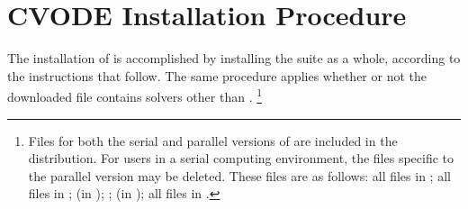 \chapter{CVODE Installation Procedure}\label{s:install}

The installation of {\cvode} is accomplished by installing the
{\sundials} suite as a whole, according to the instructions that
follow.   The same procedure applies whether or not the downloaded
file contains solvers other than {\cvode}.
\footnote{Files for both the serial and parallel versions of {\cvode}
are included in the distribution.  For users in a serial computing
environment, the files specific to the parallel version may be deleted. 
These files are as follows:
all files in ; all files in ;
 (in );
; 
 (in );
all files in .}



